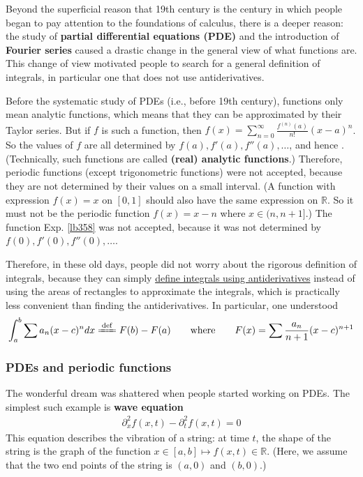 \documentclass[12pt,b5paper,notitlepage]{article}
\theoremstyle{definition}
\theoremstyle{plain}
\newcommand{\Rbb}{\mathbb R}
\numberwithin{equation}{section}
\begin{document}
Beyond the superficial reason that 19th century is the century in which people began to pay attention to the foundations of calculus, there is a deeper reason: the study of \textbf{partial differential equations (PDE)} and the introduction of \textbf{Fourier series} caused a drastic change in the general view of what functions are. This change of view motivated people to search for a general definition of integrals, in particular one that does not use antiderivatives.

Before the systematic study of PDEs (i.e., before 19th century), functions only mean analytic functions, which means that they can be approximated by their Taylor series. But if $f$ is such a function, then $f(x)=\sum_{n=0}^\infty \frac{f^{(n)}(a)}{n!}(x-a)^n$. So the values of $f$ are all determined by $f(a),f'(a),f''(a),\dots$, and hence . (Technically, such functions are called \textbf{(real) analytic functions}.) Therefore, periodic functions (except trigonometric functions) were not accepted, because they are not determined by their values on a small interval. (A function with expression $f(x)=x$ on $[0,1]$ should also have the same expression on $\Rbb$. So it must not be the periodic function $f(x)=x-n$ where $x\in(n,n+1]$.) The function Exp. \ref{lb358} was not accepted, because it was not determined by $f(0),f'(0),f''(0),\dots$.

Therefore, in these old days, people did not worry about the rigorous definition of integrals, because they can simply \uline{define integrals using antiderivatives} instead of using the areas of rectangles to approximate the integrals, which is practically less convenient than finding the antiderivatives. In particular, one understood
\begin{align*}
\int_a^b \sum a_n (x-c)^ndx\xlongequal{\mathrm{def}}F(b)-F(a)\qquad\text{where}\qquad F(x)=\sum \frac{a_n}{n+1}(x-c)^{n+1}
\end{align*}

\subsubsection{PDEs and periodic functions}

The wonderful dream was shattered when people started working on PDEs. The simplest such example is \textbf{wave equation}
\begin{align}
\partial_x^2f(x,t)-\partial_t^2f(x,t)=0
\end{align} 
This equation describes the vibration of a string: at time $t$, the shape of the string is the graph of the function $x\in[a,b]\mapsto f(x,t)\in\Rbb$. (Here, we assume that the two end points of the string is $(a,0)$ and $(b,0)$.)
\end{document}

